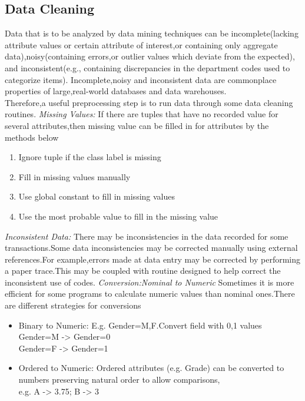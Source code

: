 \subsection{Data Cleaning}
Data that is to be analyzed by data mining techniques can be incomplete(lacking attribute values or certain attribute of interest,or containing only aggregate data),noisy(containing errors,or outlier values which deviate from the expected), and inconsistent(e.g., containing discrepancies in the department codes used to categorize items). \cite{data cleaning}Incomplete,noisy and inconsistent data are commonplace properties of large,real-world databases and data warehouses.\\Therefore,a useful preprocessing step is to run data through some data cleaning routines.
\textit{Missing Values:}
If there are tuples that have no recorded value for several attributes,then missing value can be filled  in for attributes by the methods below
\begin{enumerate}
  \item Ignore tuple if the class label is missing
  \item Fill in missing values manually 
  \item Use global constant to fill in missing values
  \item Use the most probable value to fill in the missing value
\end{enumerate}
\textit{Inconsistent Data:}
There may be inconsistencies in the data recorded for some transactions.Some data inconsistencies may be corrected manually using external references.For example,errors made at data entry may be corrected by performing a paper trace.This may be coupled with routine designed to help correct the inconsistent use of codes.
\textit{Conversion:Nominal to Numeric}
Sometimes it is more efficient for some programs to calculate numeric values than nominal ones.There are different strategies for conversions

\begin{itemize}
  \item Binary to Numeric: E.g. Gender=M,F.Convert field with 0,1 values
   \\Gender=M -\textgreater \vspace{10 mm} Gender=0
   \\Gender=F -\textgreater  \vspace{10 mm} Gender=1
\item Ordered to Numeric: Ordered attributes (e.g. Grade) can be converted to 
numbers preserving natural order to allow comparisons, \\e.g.
   A \vspace{10 mm} -\textgreater \vspace{10 mm} 3.75; \vspace{20 mm}
   B \vspace{10 mm} -\textgreater  \vspace{10 mm} 3
 
\end{itemize}
\newpage
